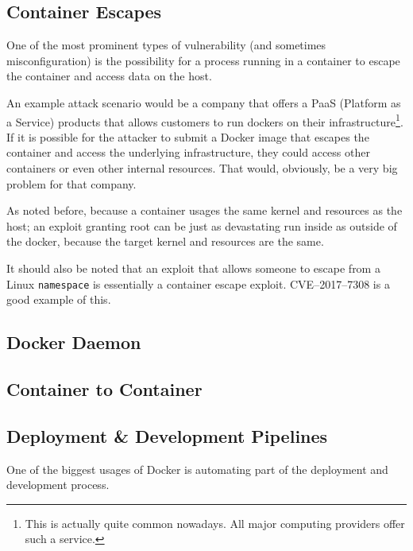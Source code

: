 \subsection{Container Escapes}
One of the most prominent types of vulnerability (and sometimes misconfiguration) is the possibility for a process running in a container to escape the container and access data on the host.

\hfill

An example attack scenario would be a company that offers a PaaS (Platform as a Service) products that allows customers to run dockers on their infrastructure\footnote{This is actually quite common nowadays. All major computing providers offer such a service.}. If it is possible for the attacker to submit a Docker image that escapes the container and access the underlying infrastructure, they could access other containers or even other internal resources. That would, obviously, be a very big problem for that company.

\hfill

As noted before, because a container usages the same kernel and resources as the host; an exploit granting root can be just as devastating run inside as outside of the docker, because the target kernel and resources are the same.

It should also be noted that an exploit that allows someone to escape from a Linux \lstinline{namespace} is essentially a container escape exploit. CVE--2017--7308\cite{cve20177308} is a good example of this.

\subsection{Docker Daemon}

\subsection{Container to Container}

\subsection{Deployment \& Development Pipelines}
One of the biggest usages of Docker is automating part of the deployment and development process.

